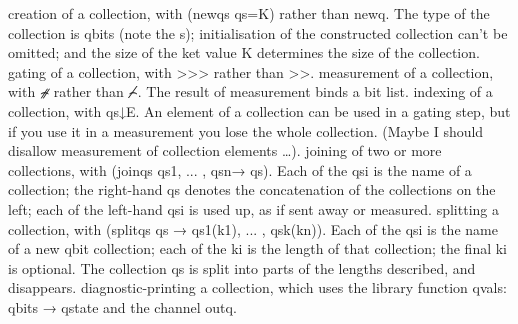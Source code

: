 creation of a collection, with (newqs qs=K) rather than newq. The type of the collection is qbits (note the s); initialisation of the constructed collection can’t be omitted; and the size of the ket value K determines the size of the collection.
gating of a collection, with >>> rather than >>.
measurement of a collection, with ⌢⃫ rather than ⌢̸. The result of measurement binds a bit list.
indexing of a collection, with qs↓E. An element of a collection can be used in a gating step, but if you use it in a measurement you lose the whole collection. (Maybe I should disallow measurement of collection elements …).
joining of two or more collections, with (joinqs qs1, ... , qsn→ qs). Each of the qsi is the name of a collection; the right-hand qs denotes the concatenation of the collections on the left; each of the left-hand qsi is used up, as if sent away or measured.
splitting a collection, with (splitqs qs → qs1(k1), ... , qsk(kn)). Each of the qsi is the name of a new qbit collection; each of the ki is the length of that collection; the final ki is optional. The collection qs is split into parts of the lengths described, and disappears.
diagnostic-printing a collection, which uses the library function qvals: qbits → qstate and the channel outq.